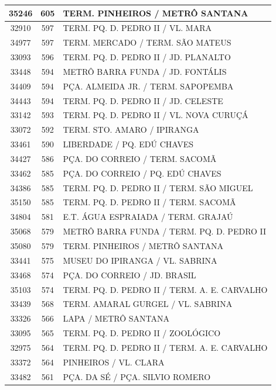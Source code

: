 \documentclass[
	12pt,				%
	oneside,			%
	a4paper,			%
	english,			%
	brazil				%
	]{abntex2ppgsi}
\begin{document}
{{{\begin{apendicesenv}
\begin{longtable}{c|c|p{7cm}}
 \hline 
35246 &	605 &	TERM. PINHEIROS / METRÔ SANTANA \\ 
 \hline 
32910 &	597 &	TERM. PQ. D. PEDRO II / VL. MARA \\ 
 \hline 
34977 &	597 &	TERM. MERCADO / TERM. SÃO MATEUS \\ 
 \hline 
33093 &	596 &	TERM. PQ. D. PEDRO II / JD. PLANALTO \\ 
 \hline 
33448 &	594 &	METRÔ BARRA FUNDA / JD. FONTÁLIS \\ 
 \hline 
34409 &	594 &	PÇA. ALMEIDA JR. / TERM. SAPOPEMBA \\ 
 \hline 
34443 &	594 &	TERM. PQ. D. PEDRO II / JD. CELESTE \\ 
 \hline 
33142 &	593 &	TERM. PQ. D. PEDRO II / VL. NOVA CURUÇÁ \\ 
 \hline 
33072 &	592 &	TERM. STO. AMARO / IPIRANGA \\ 
 \hline 
33461 &	590 &	LIBERDADE / PQ. EDÚ CHAVES \\ 
 \hline 
34427 &	586 &	PÇA. DO CORREIO / TERM. SACOMÃ \\ 
 \hline 
33462 &	585 &	PÇA. DO CORREIO / PQ. EDÚ CHAVES \\ 
 \hline 
34386 &	585 &	TERM. PQ. D. PEDRO II / TERM. SÃO MIGUEL \\ 
 \hline 
35150 &	585 &	TERM. PQ. D. PEDRO II / TERM. SACOMÃ \\ 
 \hline 
34804 &	581 &	E.T. ÁGUA ESPRAIADA / TERM. GRAJAÚ \\ 
 \hline 
35068 &	579 &	METRÔ BARRA FUNDA / TERM. PQ. D. PEDRO II \\ 
 \hline 
35080 &	579 &	TERM. PINHEIROS / METRÔ SANTANA \\ 
 \hline 
33441 &	575 &	MUSEU DO IPIRANGA / VL. SABRINA \\ 
 \hline 
33468 &	574 &	PÇA. DO CORREIO / JD. BRASIL \\ 
 \hline 
35103 &	574 &	TERM. PQ. D. PEDRO II / TERM. A. E. CARVALHO \\ 
 \hline 
33439 &	568 &	TERM. AMARAL GURGEL / VL. SABRINA \\ 
 \hline 
33326 &	566 &	LAPA / METRÔ SANTANA \\ 
 \hline 
33095 &	565 &	TERM. PQ. D. PEDRO II / ZOOLÓGICO \\ 
 \hline 
32975 &	564 &	TERM. PQ. D. PEDRO II / TERM. A. E. CARVALHO \\ 
 \hline 
33372 &	564 &	PINHEIROS / VL. CLARA \\ 
 \hline 
33482 &	561 &	PÇA. DA SÉ / PÇA. SILVIO ROMERO \\ 

\end{longtable}
\end{apendicesenv}}}}
\end{document}
